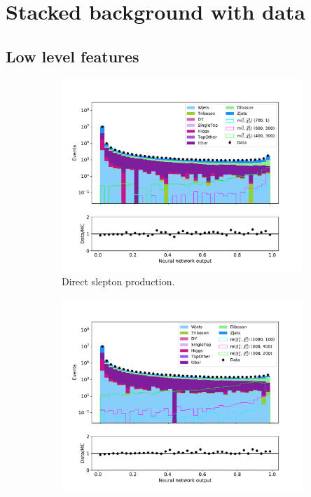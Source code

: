 \section{Stacked background with data}

\subsection{Low level features}

\begin{figure}[H]
    \centering
    \begin{subfigure}[t!]{0.49\textwidth}
        \includegraphics[width = \textwidth]{Figures/Stacked/stackedplot_NN_Low_level_slepslep.pdf}
        \caption{Direct slepton production.}
        \label{fig:}
    \end{subfigure}
    \begin{subfigure}[t!]{0.49\textwidth}
        \includegraphics[width = \textwidth]{Figures/Stacked/stackedplot_NN_Low_level_slepsnu.pdf}

\end{subfigure}
\end{figure}
